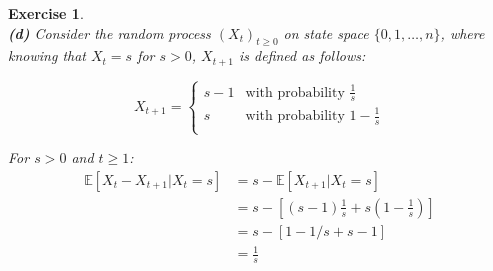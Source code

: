 \documentclass{article}
\newtheorem{exo}{Exercise}
\def\E{\mathbb{E}}
\begin{document}
\begin{exo}{\ \\}
\noindent
\textbf{(d)} Consider the random process $(X_t)_{t \geq 0}$ on state space $\{0, 1, \dots, n\}$, where knowing that $X_t = s$ for $s>0$, $X_{t+1}$ is defined as follows:

\[   
X_{t+1} = 
\begin{cases}
    s-1 &\text{with probability } \frac{1}{s} \\
    s   &\text{with probability } 1 - \frac{1}{s}\\
\end{cases}
\]

For $s>0$ and $t \geq 1$:
\begin{align*}
    \E[X_{t}-X_{t+1}|X_t=s] 
    &= s - \E[X_{t+1}| X_t=s] \\
    &= s - [(s-1)\frac{1}{s} + s(1-\frac{1}{s})] \\
    &= s - [1 - 1/s + s -1] \\
    &= \frac{1}{s} 
\end{align*}


\end{exo}
\end{document}
